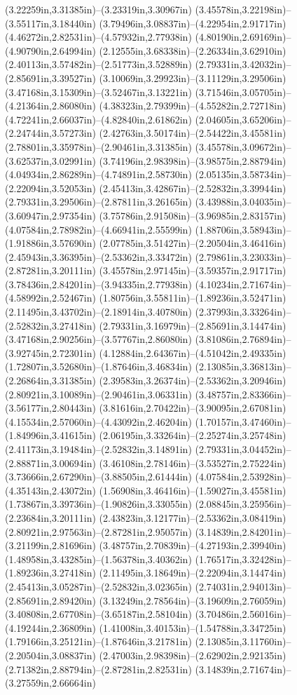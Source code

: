 (3.22259in,3.31385in)--(3.23319in,3.30967in) (3.45578in,3.22198in)--(3.55117in,3.18440in) (3.79496in,3.08837in)--(4.22954in,2.91717in) (4.46272in,2.82531in)--(4.57932in,2.77938in) (4.80190in,2.69169in)--(4.90790in,2.64994in) (2.12555in,3.68338in)--(2.26334in,3.62910in) (2.40113in,3.57482in)--(2.51773in,3.52889in) (2.79331in,3.42032in)--(2.85691in,3.39527in) (3.10069in,3.29923in)--(3.11129in,3.29506in) (3.47168in,3.15309in)--(3.52467in,3.13221in) (3.71546in,3.05705in)--(4.21364in,2.86080in) (4.38323in,2.79399in)--(4.55282in,2.72718in) (4.72241in,2.66037in)--(4.82840in,2.61862in) (2.04605in,3.65206in)--(2.24744in,3.57273in) (2.42763in,3.50174in)--(2.54422in,3.45581in) (2.78801in,3.35978in)--(2.90461in,3.31385in) (3.45578in,3.09672in)--(3.62537in,3.02991in) (3.74196in,2.98398in)--(3.98575in,2.88794in) (4.04934in,2.86289in)--(4.74891in,2.58730in) (2.05135in,3.58734in)--(2.22094in,3.52053in) (2.45413in,3.42867in)--(2.52832in,3.39944in) (2.79331in,3.29506in)--(2.87811in,3.26165in) (3.43988in,3.04035in)--(3.60947in,2.97354in) (3.75786in,2.91508in)--(3.96985in,2.83157in) (4.07584in,2.78982in)--(4.66941in,2.55599in) (1.88706in,3.58943in)--(1.91886in,3.57690in) (2.07785in,3.51427in)--(2.20504in,3.46416in) (2.45943in,3.36395in)--(2.53362in,3.33472in) (2.79861in,3.23033in)--(2.87281in,3.20111in) (3.45578in,2.97145in)--(3.59357in,2.91717in) (3.78436in,2.84201in)--(3.94335in,2.77938in) (4.10234in,2.71674in)--(4.58992in,2.52467in) (1.80756in,3.55811in)--(1.89236in,3.52471in) (2.11495in,3.43702in)--(2.18914in,3.40780in) (2.37993in,3.33264in)--(2.52832in,3.27418in) (2.79331in,3.16979in)--(2.85691in,3.14474in) (3.47168in,2.90256in)--(3.57767in,2.86080in) (3.81086in,2.76894in)--(3.92745in,2.72301in) (4.12884in,2.64367in)--(4.51042in,2.49335in) (1.72807in,3.52680in)--(1.87646in,3.46834in) (2.13085in,3.36813in)--(2.26864in,3.31385in) (2.39583in,3.26374in)--(2.53362in,3.20946in) (2.80921in,3.10089in)--(2.90461in,3.06331in) (3.48757in,2.83366in)--(3.56177in,2.80443in) (3.81616in,2.70422in)--(3.90095in,2.67081in) (4.15534in,2.57060in)--(4.43092in,2.46204in) (1.70157in,3.47460in)--(1.84996in,3.41615in) (2.06195in,3.33264in)--(2.25274in,3.25748in) (2.41173in,3.19484in)--(2.52832in,3.14891in) (2.79331in,3.04452in)--(2.88871in,3.00694in) (3.46108in,2.78146in)--(3.53527in,2.75224in) (3.73666in,2.67290in)--(3.88505in,2.61444in) (4.07584in,2.53928in)--(4.35143in,2.43072in) (1.56908in,3.46416in)--(1.59027in,3.45581in) (1.73867in,3.39736in)--(1.90826in,3.33055in) (2.08845in,3.25956in)--(2.23684in,3.20111in) (2.43823in,3.12177in)--(2.53362in,3.08419in) (2.80921in,2.97563in)--(2.87281in,2.95057in) (3.14839in,2.84201in)--(3.21199in,2.81696in) (3.48757in,2.70839in)--(4.27193in,2.39940in) (1.48958in,3.43285in)--(1.56378in,3.40362in) (1.76517in,3.32428in)--(1.89236in,3.27418in) (2.11495in,3.18649in)--(2.22094in,3.14474in) (2.45413in,3.05287in)--(2.52832in,3.02365in) (2.74031in,2.94013in)--(2.85691in,2.89420in) (3.13249in,2.78564in)--(3.19609in,2.76059in) (3.40808in,2.67708in)--(3.65187in,2.58104in) (3.70486in,2.56016in)--(4.19244in,2.36809in) (1.41008in,3.40153in)--(1.54788in,3.34725in) (1.79166in,3.25121in)--(1.87646in,3.21781in) (2.13085in,3.11760in)--(2.20504in,3.08837in) (2.47003in,2.98398in)--(2.62902in,2.92135in) (2.71382in,2.88794in)--(2.87281in,2.82531in) (3.14839in,2.71674in)--(3.27559in,2.66664in) 